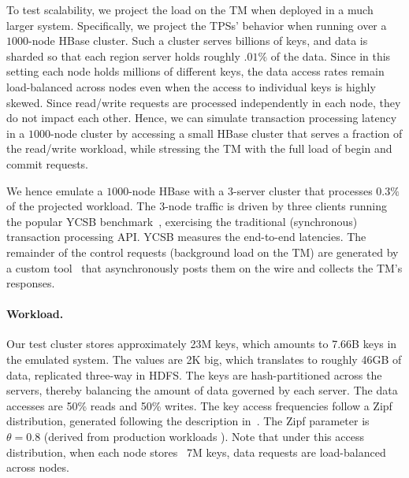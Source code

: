 To test scalability, we project the load on the TM when deployed in a much larger system. 
Specifically, we project the TPSs' behavior when running over a $1000$-node HBase cluster.
Such a cluster serves billions of keys, and data is sharded so that each region server 
holds roughly $.01\%$ of the data.
Since in this setting each node holds millions of different keys, 
the data access rates remain load-balanced across nodes 
even when the access to individual keys is highly skewed. 
Since read/write requests are processed independently in each node, 
they do not impact each other. Hence, we can simulate transaction processing latency in 
a $1000$-node cluster
by accessing a small HBase cluster that serves a fraction of the read/write workload, 
while stressing the TM with the full load of begin and commit requests. 

We hence emulate a $1000$-node HBase with a $3$-server cluster that processes $0.3\%$ of the projected workload. 
The $3$-node traffic is driven by three clients running the popular YCSB benchmark~\cite{Cooper:2010:BCS:1807128.1807152}, 
exercising the traditional (synchronous) transaction processing API. YCSB measures the end-to-end latencies.
The remainder of the control requests (background load on the TM) are generated by a custom tool~\cite{Omid2017} 
that asynchronously posts them on the wire and collects the TM's responses. 

\paragraph{Workload.}

Our test cluster stores approximately 23M keys, which amounts to 7.66B keys in the emulated system. 
The values are 2K big, which translates to roughly 46GB of data, replicated three-way in HDFS. The keys are hash-partitioned
across the servers, thereby balancing the amount of data governed by each server. The data accesses are 50\% reads and 
50\% writes. The key access frequencies follow a Zipf distribution, generated following 
the description in~\cite{Gray:1994:QGB:191839.191886}. The Zipf parameter is $\theta=0.8$ (derived from production 
workloads ). 
Note that under this access distribution, when each node stores ~7M keys, data requests are load-balanced across nodes.

